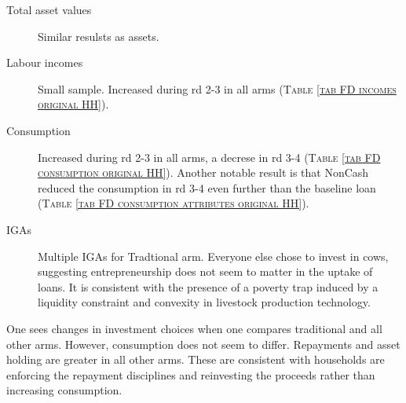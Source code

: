 \begin{description}
\item[Total asset values]	Similar resulsts as assets.
\item[Labour incomes]	Small sample. Increased during rd 2-3 in all arms (\textsc{\normalsize Table \ref{tab FD incomes original HH}}). 
\item[Consumption]	Increased during rd 2-3 in all arms, a decrese in rd 3-4 (\textsc{\normalsize Table \ref{tab FD consumption original HH}}). Another notable result is that \textsf{NonCash} reduced the consumption in rd 3-4 even further than the baseline loan (\textsc{\normalsize Table \ref{tab FD consumption attributes original HH}}).
\item[IGAs]	Multiple IGAs for \textsf{Tradtional} arm. Everyone else chose to invest in cows, suggesting entrepreneurship does not seem to matter in the uptake of loans. It is consistent with the presence of a poverty trap induced by a liquidity constraint and convexity in livestock production technology.
\end{description}

One sees changes in investment choices when one compares \textsf{traditional} and all other arms. However, consumption does not seem to differ. Repayments and asset holding are greater in all other arms. These are consistent with households are enforcing the repayment disciplines and reinvesting the proceeds rather than increasing consumption. 


